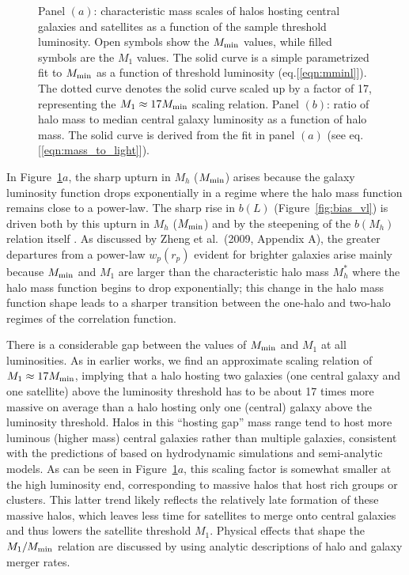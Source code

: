\documentclass[]{emulateapj}
\newcommand{\wrp}{{w_p(r_p)}}
\begin{document}
\begin{figure*}[tbp]
\caption[]{\label{fig:M1_Mmin}
Panel $(a)$: characteristic mass scales of halos hosting central galaxies and 
satellites as a function of the sample threshold luminosity. Open symbols 
show the $M_{\rm min}$ values, while filled symbols are the 
$M_1$ values.  The solid curve is a simple parametrized fit to $M_{\rm min}$
as a function of threshold luminosity (eq.[\ref{eqn:mminl}]). The dotted 
curve denotes the solid curve scaled up by a factor of 17, representing the 
$M_1 \approx 17 M_{\rm min}$ scaling relation. Panel $(b)$: ratio of halo
mass to median central galaxy luminosity as a function of halo mass. The 
solid curve is derived from the fit in panel $(a)$ (see 
eq.[\ref{eqn:mass_to_light}]).
}
\end{figure*}


In Figure~\ref{fig:M1_Mmin}$a$, the sharp upturn in $M_h$ ($M_{\rm min}$) 
arises because the galaxy luminosity
function drops exponentially in a regime where the halo mass function
remains close to a power-law.  The sharp rise in $b(L)$
(Figure~\ref{fig:bias_vl}) is driven both by this upturn in
$M_h$ ($M_{\rm min}$) and by the steepening of the $b(M_h)$ relation
itself \citep{mo96,jing98c,sheth01,tinker10}.
As discussed by Zheng et al.\ (2009, Appendix A), the greater 
departures from a power-law $\wrp$ evident for brighter galaxies
arise mainly because $M_{\rm min}$ and $M_1$ are larger than 
the characteristic halo mass $M^*_h$ where the halo mass function
begins to drop exponentially; this change in the halo mass function
shape leads to a sharper transition between the one-halo and two-halo 
regimes of the correlation function.



There is a considerable gap between the values of $M_{\rm min}$ and $M_1$ at all
luminosities. As in earlier works, we find an approximate scaling relation
of $M_1 \approx 17 M_{\rm min}$, implying that a halo hosting two galaxies (one
central galaxy and one satellite) above the luminosity threshold has to be
about 17 times more massive on average than a halo hosting only one (central)
galaxy above the luminosity threshold. Halos in this ``hosting gap'' mass
range tend to host more luminous (higher mass) central galaxies rather than
multiple galaxies, consistent with the predictions of \citet{berlind03}
based on hydrodynamic simulations and semi-analytic models.
%
As can be seen in Figure~\ref{fig:M1_Mmin}$a$, this scaling factor is somewhat 
smaller at the high luminosity end, corresponding to massive halos that 
host rich groups or clusters.  This latter trend likely reflects the relatively 
late formation of these massive halos, 
which leaves less time for satellites to merge onto central galaxies
and thus lowers the satellite threshold $M_1$.
Physical effects that shape the $M_1/M_{\rm min}$ relation are 
discussed by \cite{zentner05} using analytic descriptions of halo
and galaxy merger rates.
\end{document}
